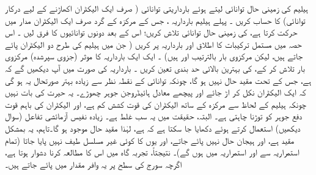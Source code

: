  

ہیلیم کی زمینی حال توانائی    لیتے ہوئے بارداریتی توانائی  ( صرف ایک الیکٹران اکھاڑنے کے لیے درکار توانائی)  کا حساب کریں ۔   پہلے ہیلیم بارداریہ ،   جس کے مرکزہ کے گرد صرف ایک الیکٹران مدار میں حرکت کرتا ہے،  کی زمینی حال توانائی تلاش کریں؛ اس کے بعد دونوں توانائیوں کا فرق لیں ۔
اس حصہ میں مستمل ترکیبات کا اطلاق    اور    بارداریہ  پر کریں ( جن میں ہیلیم کی طرح دو الیکٹران پائے جاتے ہیں، لیکن  مرکزوی بار بالترتیب    اور   ہیں)  ۔  ایک ایک بارداریہ  کا موثر (جزوی سپرشدہ)  مرکزوی بار تلاش کر کے،     کی  بہترین بالائی حد بندی تعین کریں ۔     بارداریہ    کی صورت میں آپ دیکھیں گے کہ     ہے،  جس کے تحت  مقید حال نہیں ہو گا، چونکہ توانائی کے نقطہ نظر سے زیادہ   بہتر صورتحال یہ  ہو گی کہ  ایک الیکٹران نکل کر اڑ جائے اور پیچھے معادل  ہائیڈروجن جوہر چھوڑے۔ یہ حیرت کی بات نہیں چونکہ ہیلیم  کے لحاظ سے مرکزہ کے ساتھ الیکٹران کی قوت کشش کم ہے، اور الیکٹران کی باہم  قوت دفع جوہر کو توڑنا چاہتی ہے۔     البتہ، حقیقت میں یہ سب غلط ہے۔ زیادہ نفیس  آزمائشی تفاعل (سوال  دیکھیں) استعمال کرتے ہوئے دکھایا جا سکتا ہے کہ  ہے، لہٰذا مقید حال موجود ہو گا۔تاہم،  یہ  بمشکل مقید  ہے، اور ہیجان حال نہیں پائے جاتے، اور یوں  کا کوئی غیر مسلسل طیف نہیں پایا جاتا (تمام  استمراریہ سے اور استمراریہ میں ہوں گے)۔ نتیجتاً، تجربہ گاہ میں اس کا مطالعہ کرنا دشوار ہوتا ہے، اگرچہ سورج کی سطح پر یہ وافر مقدار میں  پائے جاتے ہیں۔

